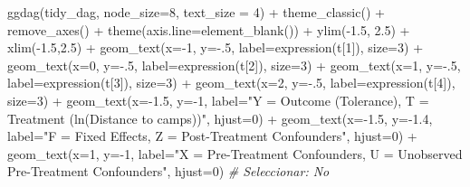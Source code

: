 \documentclass[
  12pt,
  a4paper,
]{article}
\newenvironment{Shaded}{\begin{snugshade}}{\end{snugshade}}
\newcommand{\AttributeTok}[1]{\textcolor[rgb]{0.77,0.63,0.00}{#1}}
\newcommand{\CommentTok}[1]{\textcolor[rgb]{0.56,0.35,0.01}{\textit{#1}}}
\newcommand{\DecValTok}[1]{\textcolor[rgb]{0.00,0.00,0.81}{#1}}
\newcommand{\FloatTok}[1]{\textcolor[rgb]{0.00,0.00,0.81}{#1}}
\newcommand{\FunctionTok}[1]{\textcolor[rgb]{0.00,0.00,0.00}{#1}}
\newcommand{\NormalTok}[1]{#1}
\newcommand{\SpecialCharTok}[1]{\textcolor[rgb]{0.00,0.00,0.00}{#1}}
\newcommand{\StringTok}[1]{\textcolor[rgb]{0.31,0.60,0.02}{#1}}
\begin{document}
\begin{Shaded}
\begin{Highlighting}[]
\FunctionTok{ggdag}\NormalTok{(tidy\_dag, }\AttributeTok{node\_size=}\DecValTok{8}\NormalTok{, }\AttributeTok{text\_size =} \DecValTok{4}\NormalTok{) }\SpecialCharTok{+}
  \FunctionTok{theme\_classic}\NormalTok{() }\SpecialCharTok{+} \FunctionTok{remove\_axes}\NormalTok{() }\SpecialCharTok{+} \FunctionTok{theme}\NormalTok{(}\AttributeTok{axis.line=}\FunctionTok{element\_blank}\NormalTok{()) }\SpecialCharTok{+}
  \FunctionTok{ylim}\NormalTok{(}\SpecialCharTok{{-}}\FloatTok{1.5}\NormalTok{, }\FloatTok{2.5}\NormalTok{) }\SpecialCharTok{+} \FunctionTok{xlim}\NormalTok{(}\SpecialCharTok{{-}}\FloatTok{1.5}\NormalTok{,}\FloatTok{2.5}\NormalTok{) }\SpecialCharTok{+}
  \FunctionTok{geom\_text}\NormalTok{(}\AttributeTok{x=}\SpecialCharTok{{-}}\DecValTok{1}\NormalTok{, }\AttributeTok{y=}\SpecialCharTok{{-}}\NormalTok{.}\DecValTok{5}\NormalTok{, }\AttributeTok{label=}\FunctionTok{expression}\NormalTok{(t[}\DecValTok{1}\NormalTok{]), }\AttributeTok{size=}\DecValTok{3}\NormalTok{) }\SpecialCharTok{+}
  \FunctionTok{geom\_text}\NormalTok{(}\AttributeTok{x=}\DecValTok{0}\NormalTok{, }\AttributeTok{y=}\SpecialCharTok{{-}}\NormalTok{.}\DecValTok{5}\NormalTok{, }\AttributeTok{label=}\FunctionTok{expression}\NormalTok{(t[}\DecValTok{2}\NormalTok{]), }\AttributeTok{size=}\DecValTok{3}\NormalTok{) }\SpecialCharTok{+}
  \FunctionTok{geom\_text}\NormalTok{(}\AttributeTok{x=}\DecValTok{1}\NormalTok{, }\AttributeTok{y=}\SpecialCharTok{{-}}\NormalTok{.}\DecValTok{5}\NormalTok{, }\AttributeTok{label=}\FunctionTok{expression}\NormalTok{(t[}\DecValTok{3}\NormalTok{]), }\AttributeTok{size=}\DecValTok{3}\NormalTok{) }\SpecialCharTok{+}
  \FunctionTok{geom\_text}\NormalTok{(}\AttributeTok{x=}\DecValTok{2}\NormalTok{, }\AttributeTok{y=}\SpecialCharTok{{-}}\NormalTok{.}\DecValTok{5}\NormalTok{, }\AttributeTok{label=}\FunctionTok{expression}\NormalTok{(t[}\DecValTok{4}\NormalTok{]), }\AttributeTok{size=}\DecValTok{3}\NormalTok{) }\SpecialCharTok{+}
  \FunctionTok{geom\_text}\NormalTok{(}\AttributeTok{x=}\SpecialCharTok{{-}}\FloatTok{1.5}\NormalTok{, }\AttributeTok{y=}\SpecialCharTok{{-}}\DecValTok{1}\NormalTok{, }\AttributeTok{label=}\StringTok{"Y = Outcome (Tolerance),}
\StringTok{T = Treatment (ln(Distance to camps))"}\NormalTok{, }\AttributeTok{hjust=}\DecValTok{0}\NormalTok{) }\SpecialCharTok{+}
  \FunctionTok{geom\_text}\NormalTok{(}\AttributeTok{x=}\SpecialCharTok{{-}}\FloatTok{1.5}\NormalTok{, }\AttributeTok{y=}\SpecialCharTok{{-}}\FloatTok{1.4}\NormalTok{, }\AttributeTok{label=}\StringTok{"F = Fixed Effects,}
\StringTok{Z = Post{-}Treatment Confounders"}\NormalTok{, }\AttributeTok{hjust=}\DecValTok{0}\NormalTok{) }\SpecialCharTok{+}
  \FunctionTok{geom\_text}\NormalTok{(}\AttributeTok{x=}\DecValTok{1}\NormalTok{, }\AttributeTok{y=}\SpecialCharTok{{-}}\DecValTok{1}\NormalTok{, }\AttributeTok{label=}\StringTok{"X = Pre{-}Treatment Confounders,}
\StringTok{U = Unobserved Pre{-}Treatment Confounders"}\NormalTok{, }\AttributeTok{hjust=}\DecValTok{0}\NormalTok{)}
\CommentTok{\# Seleccionar: No}


\end{Highlighting}
\end{Shaded}
\end{document}
